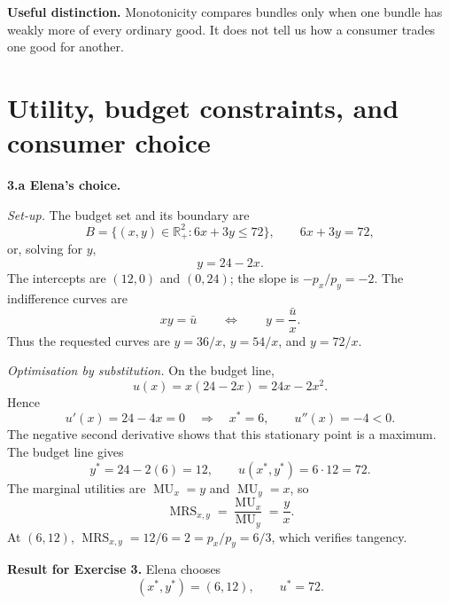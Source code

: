 \documentclass[11pt,a4paper]{article}
\newcommand{\MRS}{\operatorname{MRS}}
\newcommand{\MU}{\operatorname{MU}}
\begin{document}
\begin{tipbox}
\textbf{Useful distinction.} Monotonicity compares bundles only when one
bundle has weakly more of every ordinary good. It does not tell us how a
consumer trades one good for another.
\end{tipbox}

\section{Utility, budget constraints, and consumer choice}

\textbf{3.a Elena's choice.}

\textit{Set-up.} The budget set and its boundary are
\[
  B=\{(x,y)\in\mathbb{R}_+^2:6x+3y\leq72\},
  \qquad
  6x+3y=72,
\]
or, solving for \(y\),
\[
  y=24-2x.
\]
The intercepts are \((12,0)\) and \((0,24)\); the slope is
\(-p_x/p_y=-2\). The indifference curves are
\[
  xy=\bar u
  \qquad\Longleftrightarrow\qquad
  y=\frac{\bar u}{x}.
\]
Thus the requested curves are \(y=36/x\), \(y=54/x\), and \(y=72/x\).

\textit{Optimisation by substitution.} On the budget line,
\[
  u(x) = x(24-2x)=24x-2x^2.
\]
Hence
\[
  u'(x)=24-4x=0
  \quad\Longrightarrow\quad x^*=6,
  \qquad
  u''(x)=-4<0.
\]
The negative second derivative shows that this stationary point is a maximum.
The budget line gives
\[
  y^*=24-2(6)=12,
  \qquad
  u(x^*,y^*)=6\cdot12=72.
\]
The marginal utilities are \(\MU_x=y\) and \(\MU_y=x\), so
\[
  \MRS_{x,y}=\frac{\MU_x}{\MU_y}=\frac{y}{x}.
\]
At \((6,12)\), \(\MRS_{x,y}=12/6=2=p_x/p_y=6/3\), which verifies
tangency.

\begin{center}
\end{center}

\begin{solutionbox}
\textbf{Result for Exercise 3.} Elena chooses
\[
  \boxed{(x^*,y^*)=(6,12),\qquad u^*=72.}
\]
\end{solutionbox}
\end{document}
